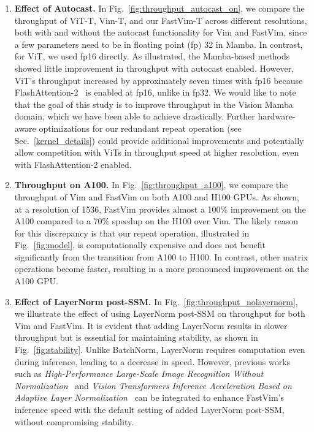 \begin{enumerate}
    \item \textbf{Effect of Autocast.} In Fig.~\ref{fig:throughput_autocast_on}, we compare the throughput of ViT-T, Vim-T, and our FastVim-T across different resolutions, both with and without the autocast functionality for Vim and FastVim, since a few parameters need to be in floating point (fp) 32 in Mamba. In contrast, for ViT, we used fp16 directly. As illustrated, the Mamba-based methods showed little improvement in throughput with autocast enabled. However, ViT's throughput increased by approximately seven times with fp16 because FlashAttention-2~\cite{dao2023flashattention} is enabled at fp16, unlike in fp32. We would like to note that the goal of this study is to improve throughput in the Vision Mamba domain, which we have been able to achieve drastically. Further hardware-aware optimizations for our redundant repeat operation (see Sec.~\ref{kernel_details}) could provide additional improvements and potentially allow competition with ViTs in throughput speed at higher resolution, even with FlashAttention-2 enabled.
\\

    \item \textbf{Throughput on A100.} In Fig.~\ref{fig:throughput_a100}, we compare the throughput of Vim and FastVim on both A100 and H100 GPUs. As shown, at a resolution of 1536, FastVim provides almost a 100\% improvement on the A100 compared to a 70\% speedup on the H100 over Vim. The likely reason for this discrepancy is that our repeat operation, illustrated in Fig.~\ref{fig:model}, is computationally expensive and does not benefit significantly from the transition from A100 to H100. In contrast, other matrix operations become faster, resulting in a more pronounced improvement on the A100 GPU. 
\\

    \item \textbf{Effect of LayerNorm post-SSM.} In Fig.~\ref{fig:throughput_nolayernorm}, we illustrate the effect of using LayerNorm post-SSM on throughput for both Vim and FastVim. It is evident that adding LayerNorm results in slower throughput but is essential for maintaining stability, as shown in Fig.~\ref{fig:stability}. Unlike BatchNorm, LayerNorm requires computation even during inference, leading to a decrease in speed. However, previous works such as \textit{High-Performance Large-Scale Image Recognition Without Normalization}~\cite{brock2021high} and \textit{Vision Transformers Inference Acceleration Based on Adaptive Layer Normalization}~\cite{keddous2024vision} can be integrated to enhance FastVim's inference speed with the default setting of added LayerNorm post-SSM, without compromising stability.
\\


\end{enumerate}
